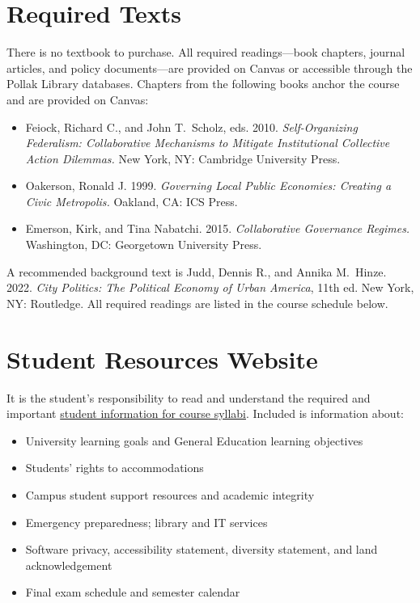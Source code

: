 \documentclass[12pt]{article}
\begin{document}
\section*{Required Texts}

There is no textbook to purchase. All required readings---book chapters, journal articles, and policy documents---are provided on Canvas or accessible through the Pollak Library databases. Chapters from the following books anchor the course and are provided on Canvas:

\begin{itemize}
    \item Feiock, Richard C., and John T.\ Scholz, eds. 2010. \emph{Self-Organizing Federalism: Collaborative Mechanisms to Mitigate Institutional Collective Action Dilemmas.} New York, NY: Cambridge University Press.
    \item Oakerson, Ronald J. 1999. \emph{Governing Local Public Economies: Creating a Civic Metropolis.} Oakland, CA: ICS Press.
    \item Emerson, Kirk, and Tina Nabatchi. 2015. \emph{Collaborative Governance Regimes.} Washington, DC: Georgetown University Press.
\end{itemize}

A recommended background text is Judd, Dennis R., and Annika M.\ Hinze. 2022. \emph{City Politics: The Political Economy of Urban America}, 11th ed. New York, NY: Routledge. All required readings are listed in the course schedule below.

\section*{Student Resources Website}
It is the student's responsibility to read and understand the required and important \href{https://fdc.fullerton.edu/teaching/student-info-syllabi.html}{student information for course syllabi}. Included is information about:

\begin{itemize}
\item University learning goals and General Education learning objectives
\item Students' rights to accommodations
\item Campus student support resources and academic integrity
\item Emergency preparedness; library and IT services
\item Software privacy, accessibility statement, diversity statement, and land acknowledgement
\item Final exam schedule and semester calendar
\end{itemize}
\end{document}
